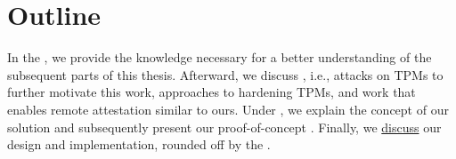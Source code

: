 \section{Outline}

In the , we provide the knowledge necessary for a better understanding of the subsequent parts of this thesis.
Afterward, we discuss , i.e., attacks on TPMs to further motivate this work, approaches to hardening TPMs, and work that enables remote attestation similar to ours.
Under , we explain the concept of our solution and subsequently present our proof-of-concept .
Finally, we \hyperref[chapter:discussion]{discuss} our design and implementation, rounded off by the .
